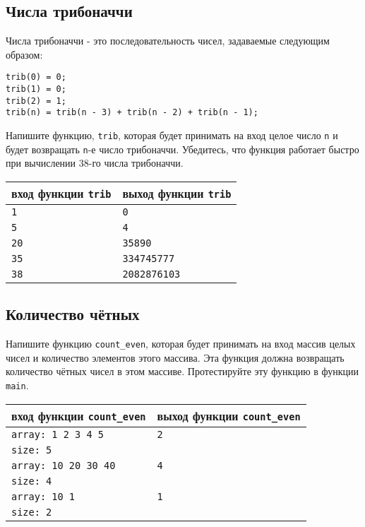 \documentclass{article}
\begin{document}
 
\subsection{Числа трибоначчи}
Числа трибоначчи - это последовательность чисел, задаваемые следующим образом:
\begin{verbatim}
trib(0) = 0; 
trib(1) = 0; 
trib(2) = 1;
trib(n) = trib(n - 3) + trib(n - 2) + trib(n - 1);
\end{verbatim}
Напишите функцию, \texttt{trib}, которая будет принимать на вход целое число \texttt{n} и будет возвращать \texttt{n}-е число трибоначчи. Убедитесь, что функция работает быстро при вычислении 38-го числа трибоначчи.

\begin{center}
\begin{tabular}{ l | l }
 вход функции \texttt{trib} & выход функции \texttt{trib} \\ \hline
 \texttt{1} & \texttt{0}  \\
 \texttt{5} & \texttt{4}  \\
 \texttt{20} & \texttt{35890}  \\
 \texttt{35} & \texttt{334745777}  \\
 \texttt{38} & \texttt{2082876103}  \\
\end{tabular}
\end{center} 
 
 
\subsection{Количество чётных}
Напишите функцию \texttt{count\_even}, которая будет принимать на вход массив целых чисел и количество элементов этого массива. Эта функция должна возвращать количество чётных чисел в этом массиве. Протестируйте эту функцию в функции \texttt{main}.
\begin{center}
\begin{tabular}{ l | l }
 вход функции \texttt{count\_even} & выход функции \texttt{count\_even} \\ \hline
 \texttt{array: 1 2 3 4 5} & \texttt{2} \\
 \texttt{size: 5} & \\ \hline
 \texttt{array: 10 20 30 40} & \texttt{4} \\
 \texttt{size: 4} & \\ \hline
 \texttt{array: 10 1} & \texttt{1} \\
 \texttt{size: 2} & \\
\end{tabular}
\end{center} 
 
\end{document}

